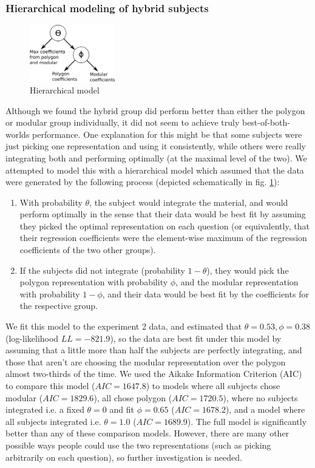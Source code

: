 \documentclass[man,10pt]{apa6}
\begin{document}
\subsubsection{Hierarchical modeling of hybrid subjects}
\begin{figure}
\centering
\includegraphics[width=0.33\textwidth]{figures/hierarchical_model_schematic.png}
\caption{Hierarchical model}
\label{hierarchicalmodel}

\end{figure}
Although we found the hybrid group did perform better than either the polygon or modular group individually, it did not seem to achieve truly best-of-both-worlds performance. One explanation for this might be that some subjects were just picking one representation and using it consistently, while others were really integrating both and performing optimally (at the maximal level of the two). We attempted to model this with a hierarchical model which assumed that the data were generated by the following process (depicted schematically in fig. \ref{hierarchicalmodel}): 
\begin{enumerate}
\item With probability $\theta$, the subject would integrate the material, and would perform optimally in the sense that their data would be best fit by assuming they picked the optimal representation on each question (or equivalently, that their regression coefficients were the element-wise maximum of the regression coefficients of the two other groups). 
\item If the subjects did not integrate (probability $1-\theta$), they would pick the polygon representation with probability $\phi$, and the modular representation with probability $1-\phi$, and their data would be best fit by the coefficients for the respective group.
\end{enumerate}
We fit this model to the experiment 2 data, and estimated that $\theta = 0.53, \phi = 0.38$ (log-likelihood $LL=-821.9$), so the data are best fit under this model by assuming that a little more than half the subjects are perfectly integrating, and those that aren't are choosing the modular representation over the polygon almost two-thirds of the time. We used the Aikake Information Criterion (AIC) to compare this model ($AIC = 1647.8$) to models where all subjects chose modular ($AIC=1829.6$), all chose polygon ($AIC = 1720.5$), where no subjects integrated i.e. a fixed $\theta = 0$ and fit $\phi = 0.65$ ($AIC = 1678.2$), and a model where all subjects integrated i.e. $\theta = 1.0$ ($AIC = 1689.9$). The full model is significantly better than any of these comparison models. However, there are many other possible ways people could use the two representations (such as picking arbitrarily on each question), so further investigation is needed.\par
\end{document}

